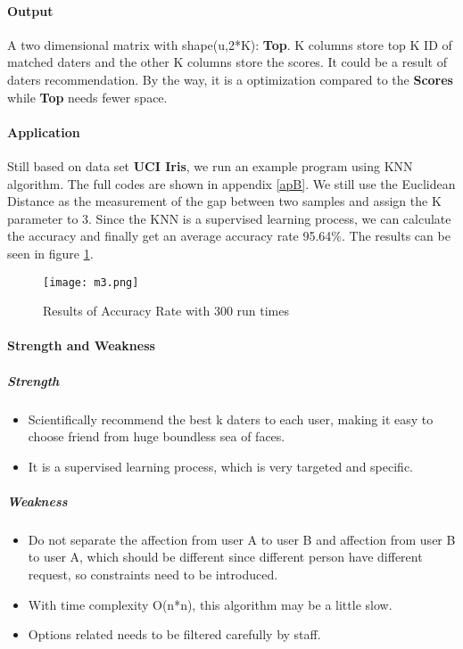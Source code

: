 \paragraph{Output} A two dimensional matrix with shape(u,2*K): \textbf{Top}. K columns store top K ID of matched daters and the other K columns store the scores. It could be a result of daters recommendation. By the way, it is a optimization compared to the \textbf{Scores} while \textbf{Top} needs fewer space.

\paragraph{Application}
Still based on data set \textbf{UCI Iris}, we run an example program using KNN algorithm. The full codes are shown in appendix \ref{apB}. We still use the Euclidean Distance as the measurement of the gap between two samples and assign the K parameter to 3. Since the KNN is a supervised learning process, we can calculate the accuracy and finally get an average accuracy rate 95.64\%. The results can be seen in figure \ref{1}.
\begin{figure}[h]
	\centering
	\texttt{[image: m3.png]}
	\caption{Results of Accuracy Rate with 300 run times}  \label{1}
\end{figure}
\newpage
\paragraph{Strength and Weakness}
\subparagraph{Strength}
\begin{itemize}
	\item Scientifically recommend the best k daters to each user, making it easy to choose friend from huge boundless sea of faces.
	\item It is a supervised learning process, which is very targeted and specific.
	
\end{itemize}
\subparagraph{Weakness}
\begin{itemize}
	\item Do not separate the affection from user A to user B and affection from user B to user A, which should be different since different person have different request, so constraints need to be introduced.
	\item With time complexity O(n*n), this algorithm may be a little slow.
	\item Options related needs to be filtered carefully by staff.
	
\end{itemize}


